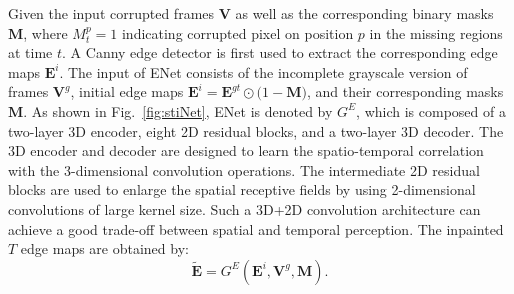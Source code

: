 Given the input corrupted frames $\boldsymbol{V}$ as well as the corresponding binary masks $\boldsymbol{M}$, where $M_t^p=1$ indicating corrupted pixel on position $p$ in the missing regions at time $t$. 
%
A Canny edge detector is first used to extract the corresponding edge maps $\boldsymbol{E}^{i}$. %
The input of ENet consists of the incomplete grayscale version of frames $\boldsymbol{V}^{g}$, initial edge maps $\boldsymbol{E}^{i}=\boldsymbol{E}^{gt}\odot\big(1-\boldsymbol{M}\big)$, and their corresponding masks $\boldsymbol{M}$.
%
As shown in Fig.~\ref{fig:stiNet}, ENet is denoted by $G^E$, which is composed of a two-layer 3D encoder, eight 2D residual blocks, and a two-layer 3D decoder. 
The 3D encoder and decoder are designed to learn the spatio-temporal correlation with the 3-dimensional convolution operations.
The intermediate 2D residual blocks are used to enlarge the spatial receptive fields by using 2-dimensional convolutions of large kernel size.
Such a 3D+2D convolution architecture can achieve a good trade-off between spatial and temporal perception.
The inpainted $T$ edge maps are obtained by:
\begin{equation}
	\label{eq:edgenet}
	\boldsymbol{\widetilde{E}}=G^E(\boldsymbol{E}^{i},\boldsymbol{V}^{g},\boldsymbol{M}).
\end{equation}

